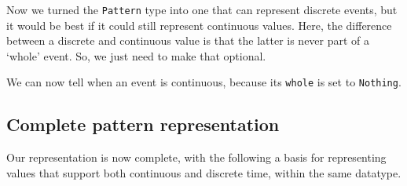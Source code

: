 Now we turned the \texttt{Pattern} type into one that can represent
discrete events, but it would be best if it could still represent
continuous values. Here, the difference between a discrete and
continuous value is that the latter is never part of a `whole' event.
So, we just need to make that optional.

\begin{Shaded}
\begin{Highlighting}[]
 \OtherTok{=} \NormalTok{ \{}  \NormalTok{,} \NormalTok{,}
\end{Highlighting}
\end{Shaded}

We can now tell when an event is continuous, because its \texttt{whole}
is set to \texttt{Nothing}.

\subsection{Complete pattern
representation}\label{complete-pattern-representation}

Our representation is now complete, with the following a basis for
representing values that support both continuous and discrete time,
within the same datatype.

\begin{Shaded}
\begin{Highlighting}[]
  \OtherTok{=} 
  \OtherTok{=} \NormalTok{ \{} \NormalTok{,} \NormalTok{\}}
     
 \OtherTok{=} \NormalTok{ \{}  \NormalTok{,} \NormalTok{,}
    \NormalTok{ (}\NormalTok{, }\NormalTok{)}
 \OtherTok{=} \NormalTok{ \{}  \OtherTok{{-}\textgreater{}}\NormalTok{ [}\NormalTok{ a]\}}
    \NormalTok{ (}\NormalTok{)}
\end{Highlighting}
\end{Shaded}

